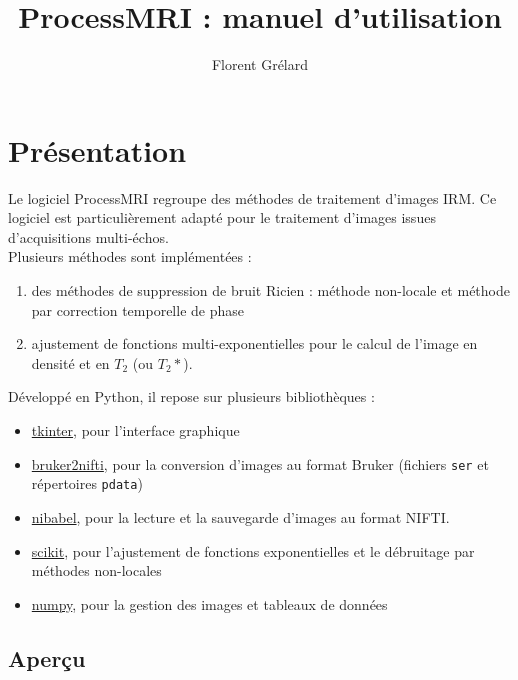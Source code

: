 \documentclass[french]{article}
\begin{document}
\title{ProcessMRI : manuel d'utilisation}

\author{Florent Grélard}

\maketitle

\newpage

\section{Présentation}
Le logiciel ProcessMRI regroupe des méthodes de traitement d'images IRM. Ce logiciel est particulièrement adapté pour le traitement d'images issues d'acquisitions multi-échos. \\

Plusieurs méthodes sont implémentées :
\begin{enumerate}
\item des méthodes de suppression de bruit Ricien : méthode non-locale
  et méthode par correction temporelle de phase
\item ajustement de fonctions multi-exponentielles pour le calcul de
  l'image en densité et en $T_2$ (ou $T_2*$).
\end{enumerate}

Développé en Python, il repose sur plusieurs bibliothèques :
\begin{itemize}
\item \href{https://pypi.org/project/tkinter/}{tkinter}, pour l'interface graphique
\item \href{https://pypi.org/project/bruker2nifti/}{bruker2nifti}, pour la conversion d'images au format Bruker
  (fichiers \texttt{ser} et répertoires \texttt{pdata})
\item \href{https://pypi.org/project/nibabel/}{nibabel}, pour la lecture et la sauvegarde d'images au format
  NIFTI.
\item \href{https://pypi.org/project/scikit/}{scikit}, pour l'ajustement de fonctions exponentielles et le
  débruitage par méthodes non-locales
\item \href{https://pypi.org/project/numpy/}{numpy}, pour la gestion des images et tableaux de données
\end{itemize}

\subsection{Aperçu}
\label{sec:apercu}
\end{document}
